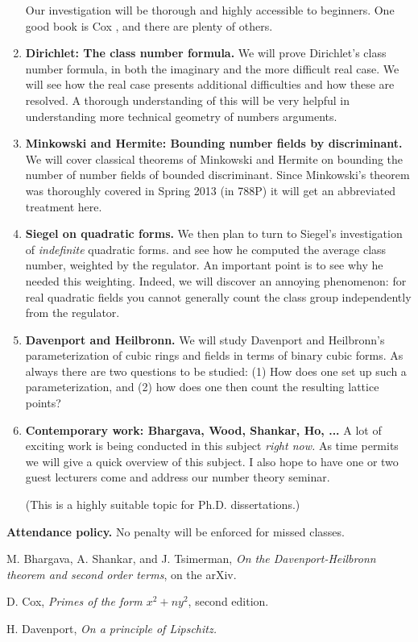\documentclass[11pt]{amsart}
\theoremstyle{remark}
\numberwithin{theorem}{section} \numberwithin{equation}{section}
\begin{document}
\begin{enumerate}[1.]
Our investigation will be thorough and highly accessible to beginners. One good book is Cox \cite{cox}, and there
are plenty of others.

\item {\bf Dirichlet: The class number formula.}
We will prove Dirichlet's class number formula, in both the imaginary and the more difficult real case. We will
see how the real case presents additional difficulties and how these are resolved. A thorough understanding of
this will be very helpful in understanding more technical geometry of numbers arguments.

\item {\bf Minkowski and Hermite: Bounding number fields by discriminant.}
We will cover classical theorems of Minkowski and Hermite on bounding the number of number fields of bounded
discriminant. Since Minkowski's theorem was thoroughly covered in Spring 2013 (in 788P) it will get an abbreviated
treatment here.

\item {\bf Siegel on quadratic forms.}
We then plan to 
turn to Siegel's investigation of {\itshape indefinite} quadratic forms. and see how he computed
the average class number, weighted by the regulator. An important point is to see why he needed this weighting.
Indeed, we will discover an annoying phenomenon: for real quadratic fields you cannot generally count the
class group independently from the regulator.

\item {\bf Davenport and Heilbronn.}
We will study Davenport and Heilbronn's parameterization of cubic rings and fields in terms of binary cubic forms.
As always there
are two questions to be studied: (1) How does one set up such a parameterization, and (2) how does one
then count the resulting lattice points?

\item {\bf Contemporary work: Bhargava, Wood, Shankar, Ho, ...}
A lot of exciting work is being conducted in this subject {\itshape right now.} As time permits we will give
a quick overview of this subject. I also hope to have one or two guest lecturers come and address our number
theory seminar.

(This is a highly suitable topic for Ph.D. dissertations.)
\end{enumerate}

{\bf Attendance policy.} No penalty will be enforced for missed classes.

\begin{thebibliography}{99}

 M. Bhargava, A. Shankar, and J. Tsimerman,
\emph{On the Davenport-Heilbronn theorem and second order terms}, on the arXiv.

 D. Cox,
\emph{Primes of the form $x^2 + n y^2$}, second edition.

 H. Davenport,
\emph{On a principle of Lipschitz.}
\end{thebibliography}
\end{document}
